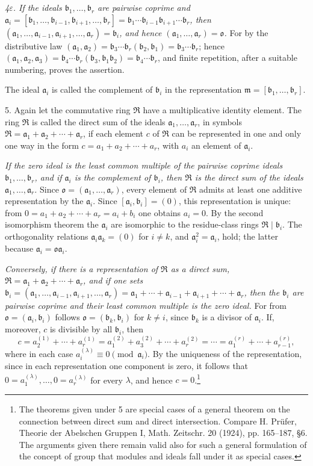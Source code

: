 \documentclass[11pt]{article}
\providecommand{\mR}{\mathfrak{R}}
\providecommand{\ma}{\mathfrak{a}}
\providecommand{\mb}{\mathfrak{b}}
\providecommand{\mm}{\mathfrak{m}}
\providecommand{\mo}{\mathfrak{o}}
\begin{document}
\emph{4$\varepsilon$. If the ideals $\mb_1,
\ldots,\mb_r$ are pairwise coprime and $\ma_i=[\mb_1,
\ldots,\mb_{i-1},\mb_{i+1},\ldots,\mb_r]=\mb_1\cdots\mb_{i-1}\mb_{i+1}\cdots\mb_r$, then $(\ma_1,
\ldots,\ma_{i-1},\ma_{i+1},\ldots,\ma_r)=\mb_i$, and hence $(\ma_1,
\ldots,\ma_r)=\mo$.} For by the distributive law $(\ma_1,\ma_2)=\mb_3\cdots\mb_r(\mb_2,\mb_1)=\mb_3\cdots\mb_r$; hence $(\ma_1,\ma_2,\ma_3)=\mb_4\cdots\mb_r(\mb_3,\mb_1\mb_2)=\mb_4\cdots\mb_r$, and finite repetition, after a suitable numbering, proves the assertion.

The ideal $\ma_i$ is called the complement of $\mb_i$ in the representation $\mm=[\mb_1,
\ldots,\mb_r]$.

5. Again let the commutative ring $\mR$ have a multiplicative identity element. The ring $\mR$ is called the direct sum of the ideals $\ma_1,
\ldots,\ma_r$, in symbols $\mR=\ma_1+\ma_2+\cdots+\ma_r$, if each element $c$ of $\mR$ can be represented in one and only one way in the form $c=a_1+a_2+\cdots+a_r$, with $a_i$ an element of $\ma_i$.

\emph{If the zero ideal is the least common multiple of the pairwise coprime ideals $\mb_1,
\ldots,\mb_r$, and if $\ma_i$ is the complement of $\mb_i$, then $\mR$ is the direct sum of the ideals $\ma_1,
\ldots,\ma_r$.} Since $\mo=(\ma_1,
\ldots,\ma_r)$, every element of $\mR$ admits at least one additive representation by the $\ma_i$. Since $[\ma_i,\mb_i]=(0)$, this representation is unique: from $0=a_1+a_2+\cdots+a_r=a_i+b_i$ one obtains $a_i=0$. By the second isomorphism theorem the $\ma_i$ are isomorphic to the residue-class rings $\mR\mid\mb_i$. The orthogonality relations $\ma_i\ma_k=(0)$ for $i\ne k$, and $\ma_i^2=\ma_i$, hold; the latter because $\ma_i=\mo\ma_i$.

\emph{Conversely, if there is a representation of $\mR$ as a direct sum, $\mR=\ma_1+\ma_2+\cdots+\ma_r$, and if one sets $\mb_i=(\ma_1,
\ldots,\ma_{i-1},\ma_{i+1},\ldots,\ma_r)=\ma_1+\cdots+\ma_{i-1}+\ma_{i+1}+\cdots+\ma_r$, then the $\mb_i$ are pairwise coprime and their least common multiple is the zero ideal.} For from $\mo=(\ma_i,\mb_i)$ follows $\mo=(\mb_k,\mb_i)$ for $k\ne i$, since $\mb_k$ is a divisor of $\ma_i$. If, moreover, $c$ is divisible by all $\mb_i$, then
\[
 c=a_2^{(1)}+\cdots+a_r^{(1)}=a_1^{(2)}+a_3^{(2)}+\cdots+a_r^{(2)}=\cdots=a_1^{(r)}+\cdots+a_{r-1}^{(r)},
\]
where in each case $a_i^{(\lambda)}\equiv0\pmod{\ma_i}$. By the uniqueness of the representation, since in each representation one component is zero, it follows that $0=a_1^{(\lambda)},
\ldots,0=a_r^{(\lambda)}$ for every $\lambda$, and hence $c=0$.\footnote{The theorems given under 5 are special cases of a general theorem on the connection between direct sum and direct intersection. Compare H. Prüfer, Theorie der Abelschen Gruppen I, Math. Zeitschr. 20 (1924), pp. 165--187, §6. The arguments given there remain valid also for such a general formulation of the concept of group that modules and ideals fall under it as special cases.}
\end{document}
